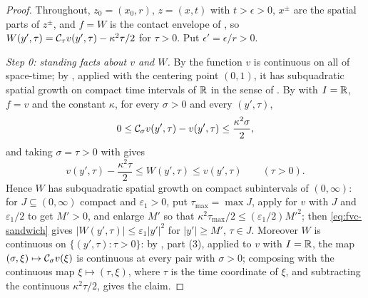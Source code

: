\begin{proof}
Throughout, $z_0=(x_0,r)$, $z=(x,t)$ with $t>\epsilon>0$, $x^\pm$ are the
spatial parts of $z^\pm$, and $f=W$ is the contact envelope of
, so $W(y',\tau)=\mathcal{C}_\tau v(y',\tau)-\kappa^2\tau/2$ for
$\tau>0$. Put $\epsilon'=\epsilon/r>0$.

\emph{Step 0: standing facts about $v$ and $W$.}
By  the function $v$ is continuous on all of space-time; by
, applied with the centering point $(0,1)$, it has
subquadratic spatial growth on compact time intervals of $\mathbb{R}$ in the sense of
. By  with $I=\mathbb{R}$, $f=v$
and the constant $\kappa$, for every $\sigma>0$ and every $(y',\tau)$,
\[
  0\le\mathcal{C}_\sigma v(y',\tau)-v(y',\tau)\le\frac{\kappa^2\sigma}{2},
\]
and taking $\sigma=\tau>0$ with  gives
\begin{equation}\label{eq:fvc-sandwich}
  v(y',\tau)-\frac{\kappa^2\tau}{2}\le W(y',\tau)\le v(y',\tau)
  \qquad(\tau>0).
\end{equation}
Hence $W$ has subquadratic spatial growth on compact subintervals of
$(0,\infty)$: for $J\subseteq(0,\infty)$ compact and $\varepsilon_1>0$, put
$\tau_{\max}=\max J$, apply  for $v$ with $J$ and
$\varepsilon_1/2$ to get $M'>0$, and enlarge $M'$ so that
$\kappa^2\tau_{\max}/2\le(\varepsilon_1/2)M'^2$; then \eqref{eq:fvc-sandwich}
gives $|W(y',\tau)|\le\varepsilon_1|y'|^2$ for $|y'|\ge M'$, $\tau\in J$.
Moreover $W$ is continuous on $\{(y',\tau):\tau>0\}$: by
, part (3), applied to $v$ with $I=\mathbb{R}$, the map
$(\sigma,\xi)\mapsto\mathcal{C}_\sigma v(\xi)$ is continuous at every pair with
$\sigma>0$; composing with the continuous map $\xi\mapsto(\tau,\xi)$, where
$\tau$ is the time coordinate of $\xi$, and subtracting the continuous
$\kappa^2\tau/2$, gives the claim.


\end{proof}
